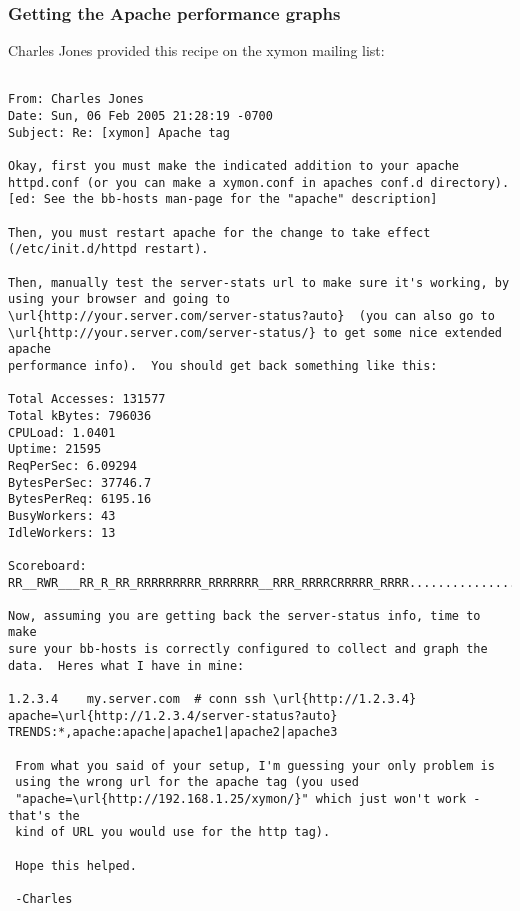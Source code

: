 \subsubsection{Getting the Apache performance graphs}


 Charles Jones provided this recipe on the xymon mailing list:
\begin{verbatim}

From: Charles Jones
Date: Sun, 06 Feb 2005 21:28:19 -0700
Subject: Re: [xymon] Apache tag

Okay, first you must make the indicated addition to your apache
httpd.conf (or you can make a xymon.conf in apaches conf.d directory).
[ed: See the bb-hosts man-page for the "apache" description]

Then, you must restart apache for the change to take effect
(/etc/init.d/httpd restart).

Then, manually test the server-stats url to make sure it's working, by
using your browser and going to
\url{http://your.server.com/server-status?auto}  (you can also go to
\url{http://your.server.com/server-status/} to get some nice extended apache
performance info).  You should get back something like this:

Total Accesses: 131577
Total kBytes: 796036
CPULoad: 1.0401
Uptime: 21595
ReqPerSec: 6.09294
BytesPerSec: 37746.7
BytesPerReq: 6195.16
BusyWorkers: 43
IdleWorkers: 13

Scoreboard: RR__RWR___RR_R_RR_RRRRRRRRR_RRRRRRR__RRR_RRRRCRRRRR_RRRR........................................................................................................................................................................................................

Now, assuming you are getting back the server-status info, time to make
sure your bb-hosts is correctly configured to collect and graph the
data.  Heres what I have in mine:

1.2.3.4    my.server.com  # conn ssh \url{http://1.2.3.4} apache=\url{http://1.2.3.4/server-status?auto} TRENDS:*,apache:apache|apache1|apache2|apache3

 From what you said of your setup, I'm guessing your only problem is
 using the wrong url for the apache tag (you used
 "apache=\url{http://192.168.1.25/xymon/}" which just won't work - that's the
 kind of URL you would use for the http tag).

 Hope this helped.

 -Charles

\end{verbatim}
 
